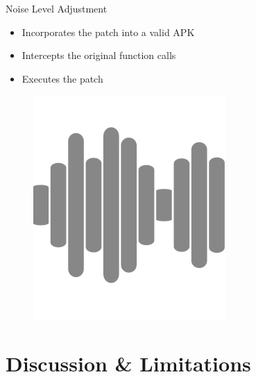 \documentclass[aspectratio=169]{beamer}
[aspectratio=169] %
\begin{document}
\begin{frame}{Noise Level Adjustment}
  \begin{minipage}{0.49\textwidth} 
    \begin{itemize}
      \item Incorporates the patch into a valid APK
      \item Intercepts the original function calls
      \item Executes the patch
    \end{itemize}
  \end{minipage}
  \hfill
  \begin{minipage}{0.49\textwidth} 
    \begin{figure}
      \centering
      \includegraphics[height=0.5\textheight]{figures/noise.png}
    \end{figure}
  \end{minipage}
\end{frame}

\section{Discussion \& Limitations}
\end{document}
